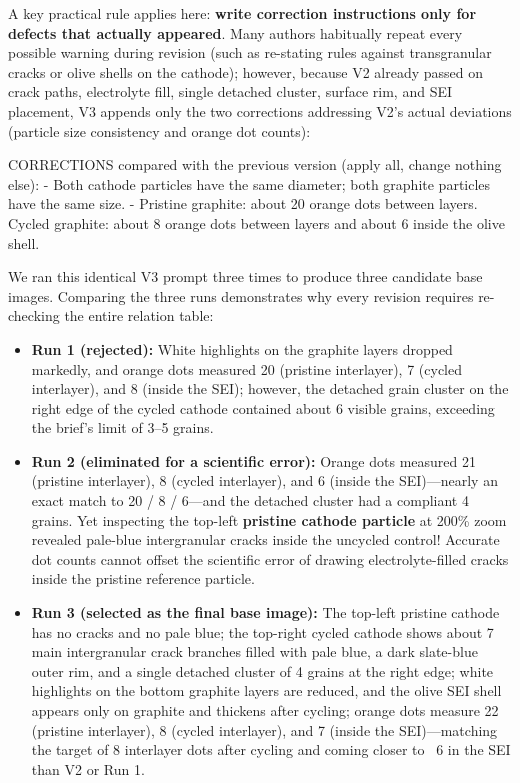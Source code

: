 A key practical rule applies here: \textbf{write correction instructions only for defects that actually appeared}. Many authors habitually repeat every possible warning during revision (such as re-stating rules against transgranular cracks or olive shells on the cathode); however, because V2 already passed on crack paths, electrolyte fill, single detached cluster, surface rim, and SEI placement, V3 appends only the two corrections addressing V2's actual deviations (particle size consistency and orange dot counts):

\begin{Prompt}

CORRECTIONS compared with the previous version (apply all, change nothing else):
- Both cathode particles have the same diameter; both graphite particles have
  the same size.
- Pristine graphite: about 20 orange dots between layers. Cycled graphite: about
  8 orange dots between layers and about 6 inside the olive shell.
\end{Prompt}

We ran this identical V3 prompt three times to produce three candidate base images. Comparing the three runs demonstrates why every revision requires re-checking the entire relation table:

\begin{itemize}
\item \textbf{Run 1 (rejected):} White highlights on the graphite layers dropped markedly, and orange dots measured 20 (pristine interlayer), 7 (cycled interlayer), and 8 (inside the SEI); however, the detached grain cluster on the right edge of the cycled cathode contained about 6 visible grains, exceeding the brief's limit of 3--5 grains.
\item \textbf{Run 2 (eliminated for a scientific error):} Orange dots measured 21 (pristine interlayer), 8 (cycled interlayer), and 6 (inside the SEI)---nearly an exact match to 20 / 8 / 6---and the detached cluster had a compliant 4 grains. Yet inspecting the top-left \textbf{pristine cathode particle} at 200\% zoom revealed pale-blue intergranular cracks inside the uncycled control! Accurate dot counts cannot offset the scientific error of drawing electrolyte-filled cracks inside the pristine reference particle.
\item \textbf{Run 3 (selected as the final base image):} The top-left pristine cathode has no cracks and no pale blue; the top-right cycled cathode shows about 7 main intergranular crack branches filled with pale blue, a dark slate-blue outer rim, and a single detached cluster of 4 grains at the right edge; white highlights on the bottom graphite layers are reduced, and the olive SEI shell appears only on graphite and thickens after cycling; orange dots measure 22 (pristine interlayer), 8 (cycled interlayer), and 7 (inside the SEI)---matching the target of 8 interlayer dots after cycling and coming closer to ~6 in the SEI than V2 or Run 1.
\end{itemize}

